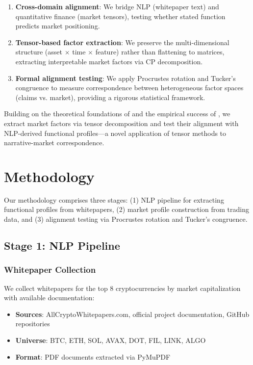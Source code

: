 \documentclass[11pt,twocolumn]{article}
\begin{document}
\begin{enumerate}[leftmargin=*]
    \item \textbf{Cross-domain alignment}: We bridge NLP (whitepaper text) and quantitative finance (market tensors), testing whether stated function predicts market positioning.
    \item \textbf{Tensor-based factor extraction}: We preserve the multi-dimensional structure (asset $\times$ time $\times$ feature) rather than flattening to matrices, extracting interpretable market factors via CP decomposition.
    \item \textbf{Formal alignment testing}: We apply Procrustes rotation and Tucker's congruence to measure correspondence between heterogeneous factor spaces (claims vs. market), providing a rigorous statistical framework.
\end{enumerate}

Building on the theoretical foundations of \citet{Babii2023Tensor} and the empirical success of \citet{Lettau2024ThreeD}, we extract market factors via tensor decomposition and test their alignment with NLP-derived functional profiles---a novel application of tensor methods to narrative-market correspondence.

\section{Methodology}
\label{sec:methodology}

Our methodology comprises three stages: (1) NLP pipeline for extracting functional profiles from whitepapers, (2) market profile construction from trading data, and (3) alignment testing via Procrustes rotation and Tucker's congruence.

\subsection{Stage 1: NLP Pipeline}

\subsubsection{Whitepaper Collection}

We collect whitepapers for the top 8 cryptocurrencies by market capitalization with available documentation:

\begin{itemize}[leftmargin=*]
    \item \textbf{Sources}: AllCryptoWhitepapers.com, official project documentation, GitHub repositories
    \item \textbf{Universe}: BTC, ETH, SOL, AVAX, DOT, FIL, LINK, ALGO
    \item \textbf{Format}: PDF documents extracted via PyMuPDF
\end{itemize}
\end{document}
